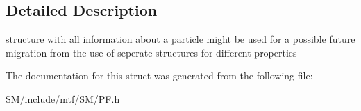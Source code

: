 \subsection{Detailed Description}
structure with all information about a particle might be used for a possible future migration from the use of seperate structures for different properties 

The documentation for this struct was generated from the following file\-:\begin{DoxyCompactItemize}
\item 
S\-M/include/mtf/\-S\-M/P\-F.\-h\end{DoxyCompactItemize}
